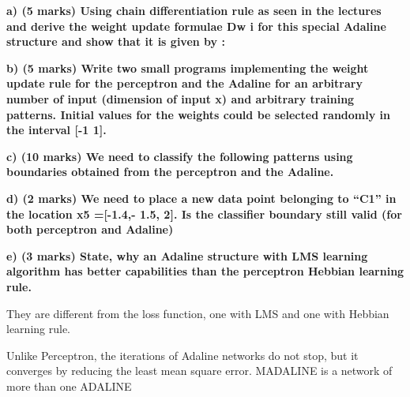 \documentclass{tron}
\begin{document}
\textbf{a) (5 marks) Using chain differentiation rule as seen in the lectures and derive the weight update formulae Dw i for this special Adaline structure and show that it is given by :}


\textbf{b) (5 marks) Write two small programs implementing the weight update rule for the perceptron and the Adaline for an arbitrary number of input (dimension of input x) and arbitrary training patterns. Initial values for the weights could be selected randomly in the interval [-1 1].}


\textbf{c) (10 marks) We need to classify the following patterns using boundaries obtained from the perceptron and the Adaline.}


\textbf{d) (2 marks) We need to place a new data point belonging to “C1” in the location x5 =[-1.4,- 1.5, 2]. Is the classifier boundary still valid (for both perceptron and Adaline)}


\textbf{e) (3 marks) State, why an Adaline structure with LMS learning algorithm has better capabilities than the perceptron Hebbian learning rule.}


They are different from the loss function, one with LMS and one with Hebbian learning rule. 

Unlike Perceptron, the iterations of Adaline networks do not stop, but it converges by reducing the least mean square error. MADALINE is a network of more than one ADALINE
\end{document}
